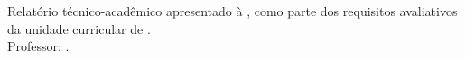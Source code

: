 \begin{capa}
    \centering

    {\ABNTEXchapterfont\large\imprimirinstituicao\par}
    \vspace{0.5cm}
    {\ABNTEXchapterfont\large\imprimircurso\par}

    \vspace*{3cm}

    {\ABNTEXchapterfont\large\imprimirautor\par}

    \vspace*{2cm}

    {\ABNTEXchapterfont\bfseries\Large\imprimirtitulo\par}

    \vfill

    \begin{flushright}
        \begin{minipage}{0.6\textwidth}
            \SingleSpacing
            Relatório técnico-acadêmico apresentado à \imprimirinstituicao, como parte dos requisitos avaliativos da unidade curricular de \imprimirdisciplina. \\
            Professor: \imprimirprofessor.
        \end{minipage}
    \end{flushright}

    \vfill

    {\large\imprimirlocal\par}
    {\large\imprimirdata\par}

\end{capa}